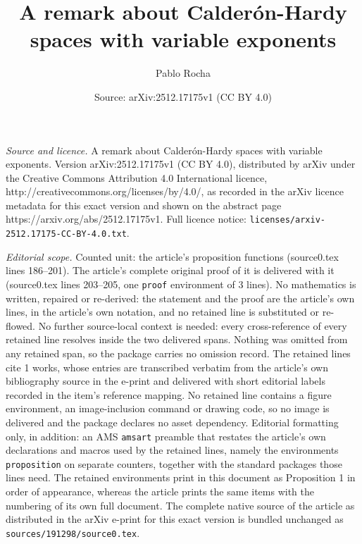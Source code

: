 \documentclass[10pt,a4paper]{amsart}
\title{A remark about Calder\'on-Hardy spaces with variable exponents}
\author{Pablo Rocha}
\date{Source: arXiv:2512.17175v1 (CC BY 4.0)}
\begin{document}
\maketitle

\noindent\emph{Source and licence.} A remark about Calder\'on-Hardy spaces with variable exponents. Version arXiv:2512.17175v1 (CC BY 4.0), distributed by arXiv under the Creative Commons Attribution 4.0 International licence, http://creativecommons.org/licenses/by/4.0/, as recorded in the arXiv licence metadata for this exact version and shown on the abstract page https://arxiv.org/abs/2512.17175v1. Full licence notice: \texttt{licenses/arxiv-2512.17175-CC-BY-4.0.txt}.\par\smallskip

\noindent\textit{Editorial scope.} Counted unit: the article's proposition functions (source0.tex lines 186--201). The article's complete original proof of it is delivered with it (source0.tex lines 203--205, one \texttt{proof} environment of 3 lines). No mathematics is written, repaired or re-derived: the statement and the proof are the article's own lines, in the article's own notation, and no retained line is substituted or re-flowed.  No further source-local context is needed: every cross-reference of every retained line resolves inside the two delivered spans.  Nothing was omitted from any retained span, so the package carries no omission record.  The retained lines cite 1 works, whose entries are transcribed verbatim from the article's own bibliography source in the e-print and delivered with short editorial labels recorded in the item's reference mapping.  No retained line contains a figure environment, an image-inclusion command or drawing code, so no image is delivered and the package declares no asset dependency.  Editorial formatting only, in addition: an AMS \texttt{amsart} preamble that restates the article's own declarations and macros used by the retained lines, namely the environments \texttt{proposition} on separate counters, together with the standard packages those lines need.  The retained environments print in this document as Proposition 1 in order of appearance, whereas the article prints the same items with the numbering of its own full document.  The complete native source of the article as distributed in the arXiv e-print for this exact version is bundled unchanged as \texttt{sources/191298/source0.tex}.
\end{document}
